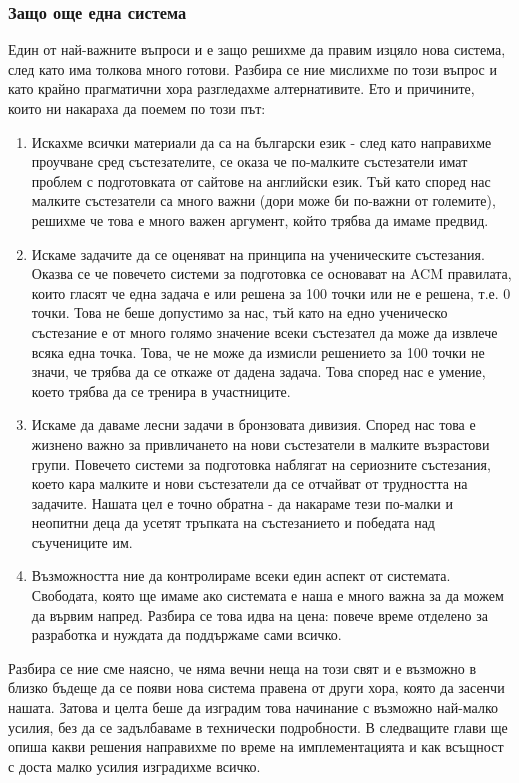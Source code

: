 \documentclass[a4paper,12pt]{article}
\begin{document}
  \subsubsection{Защо още една система}
  
  Един от най-важните въпроси и е защо решихме да правим изцяло нова система, след като има толкова много готови. Разбира се ние мислихме по този въпрос и като крайно прагматични хора разгледахме алтернативите. Ето и причините, които ни накараха да поемем по този път:
  
  \begin{enumerate}
    \item Искахме всички материали да са на български език - след като направихме проучване сред състезателите, се оказа че по-малките състезатели имат проблем с подготовката от сайтове на английски език. Тъй като според нас малките състезатели са много важни (дори може би по-важни от големите), решихме че това е много важен аргумент, който трябва да имаме предвид.
    \item Искаме задачите да се оценяват на принципа на ученическите състезания. Оказва се че повечето системи за подготовка се основават на ACM правилата, които гласят че една задача е или решена за 100 точки или не е решена, т.е. 0 точки. Това не беше допустимо за нас, тъй като на едно ученическо състезание е от много голямо значение всеки състезател да може да извлече всяка една точка. Това, че не може да измисли решението за 100 точки не значи, че трябва да се откаже от дадена задача. Това според нас е умение, което трябва да се тренира в участниците.
    \item Искаме да даваме лесни задачи в бронзовата дивизия. Според нас това е жизнено важно за привличането на нови състезатели в малките възрастови групи. Повечето системи за подготовка наблягат на сериозните състезания, което кара малките и нови състезатели да се отчайват от трудността на задачите. Нашата цел е точно обратна - да накараме тези по-малки и неопитни деца да усетят тръпката на състезанието и победата над съучениците им.
    \item Възможността ние да контролираме всеки един аспект от системата. Свободата, която ще имаме ако системата е наша е много важна за да можем да вървим напред. Разбира се това идва на цена: повече време отделено за разработка и нуждата да поддържаме сами всичко.
  \end{enumerate}
  
  Разбира се ние сме наясно, че няма вечни неща на този свят и е възможно в близко бъдеще да се появи нова система правена от други хора, която да засенчи нашата. Затова и целта беше да изградим това начинание с възможно най-малко усилия, без да се задълбаваме в технически подробности. В следващите глави ще опиша какви решения направихме по време на имплементацията и как всъщност с доста малко усилия изградихме всичко.
  
\end{document}
